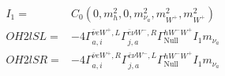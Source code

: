 \documentclass[A4,landscape]{article}
\begin{document}
\begin{align} 
I_1= & C_0(0, m^2_{h}, 0, m^2_{\nu_{{a}}}, m^2_{W^+}, m^2_{W^+}) \\ 
  OH2lSL= & -4  \Gamma^{\bar{\nu}e W^+ ,L}_{a, i} \Gamma^{\bar{e}\nu W^-,R}_{j, a} \Gamma^{h W^-W^+ }_\text{Null} I_1 m_{\nu_{{a}}} \\ 
  OH2lSR= & -4  \Gamma^{\bar{\nu}e W^+ ,R}_{a, i} \Gamma^{\bar{e}\nu W^-,L}_{j, a} \Gamma^{h W^-W^+ }_\text{Null} I_1 m_{\nu_{{a}}} \\ 
\end{align} 
\end{document}
